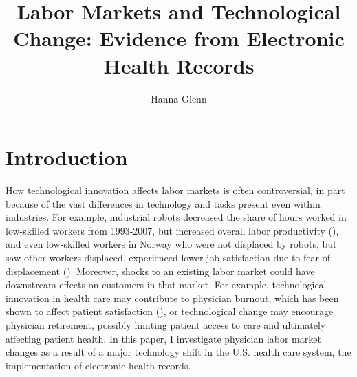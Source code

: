 \documentclass[11pt]{article}
\title{Labor Markets and Technological Change: Evidence from Electronic Health Records}
\author{Hanna Glenn}
\begin{document}
\maketitle



\vspace{1.5cm}

\section{Introduction}

How technological innovation affects labor markets is often controversial, in part because of the vast differences in technology and tasks present even within industries. For example, industrial robots decreased the share of hours worked in low-skilled workers from 1993-2007, but increased overall labor productivity  (\cite{graetz2018robots}), and even low-skilled workers in Norway who were not displaced by robots, but saw other workers displaced, experienced lower job satisfaction due to fear of displacement (\cite{schwabe2020automation}). Moreover, shocks to an existing labor market could have downstream effects on customers in that market. For example, technological innovation in health care may contribute to physician burnout, which has been shown to affect patient satisfaction (\cite{shanafelt2002burnout}), or technological change may encourage physician retirement, possibly limiting patient access to care and ultimately affecting patient health. In this paper, I investigate physician labor market changes as a result of a major technology shift in the U.S. health care system, the implementation of electronic health records.
\end{document}
